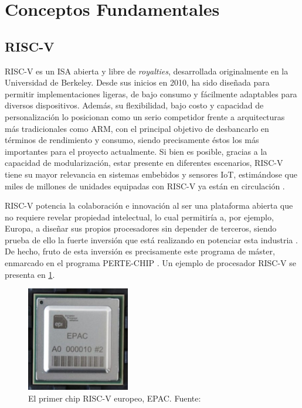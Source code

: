 \section{Conceptos Fundamentales}

\subsection{RISC-V}

RISC-V es un \ac{ISA} abierta y libre de \textit{royalties}, desarrollada originalmente en la Universidad de Berkeley. Desde sus inicios en 2010, ha sido diseñada para permitir implementaciones ligeras, de bajo consumo y fácilmente adaptables para diversos dispositivos. Además, su flexibilidad, bajo costo y capacidad de personalización lo posicionan como un serio competidor frente a arquitecturas más tradicionales como ARM, con el principal objetivo de desbancarlo en términos de rendimiento y consumo, siendo precisamente éstos los más importantes para el proyecto actualmente. Si bien es posible, gracias a la capacidad de modularización, estar presente en diferentes escenarios, RISC-V tiene su mayor relevancia en sistemas embebidos y sensores \ac{IoT}, estimándose que miles de millones de unidades equipadas con RISC-V ya están en circulación \cite{riscvInfo}.

RISC-V potencia la colaboración e innovación al ser una plataforma abierta que no requiere revelar propiedad intelectual, lo cual permitiría a, por ejemplo, Europa, a diseñar sus propios procesadores sin depender de terceros, siendo prueba de ello la fuerte inversión que está realizando en potenciar esta industria \cite{europaRISCV}. De hecho, fruto de esta inversión es precisamente este programa de máster, enmarcado en el programa PERTE-CHIP \cite{perteChip}. Un ejemplo de procesador RISC-V se presenta en \ref{fig:fotoChip}.

\begin{figure}[!ht]
  \centering
  \includegraphics[width=4.5cm]{figures/chip.png}
  \caption{El primer chip RISC-V europeo, EPAC. Fuente: \cite{chipFoto}}
  \label{fig:fotoChip}
\end{figure}

